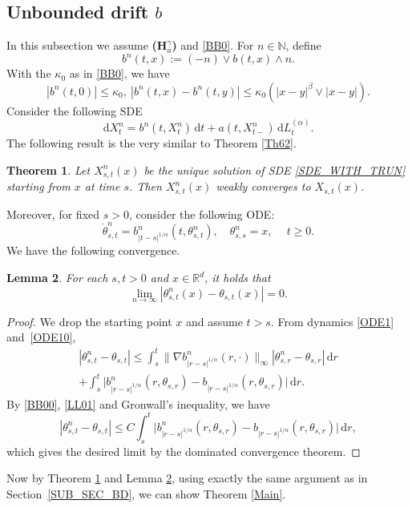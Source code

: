 \documentclass[JEP,XML,SOM,Unicode,published]{cedram}
\newcommand{\rd}{\mathrm{d}}
\theoremstyle{plain}
\newtheorem{theorem}{Theorem}[section]
\newtheorem{lemma}[theorem]{Lemma}
\theoremstyle{definition}
\newcommand\mN{\mathbb{N}}
\newcommand\mR{\mathbb{R}}
\newcommand\1{{\mathbf{1}}}
\newcommand{\dif}{\,\mathrm{d}}
\begin{document}
\subsection{Unbounded drift $b$} \label{SUB_SEC_TRUNC}
In this subsection we assume {\bf (H$^\gamma_a$)} and \eqref{BB0}.
For $n\in\mN$, define
\[
b^n(t,x):=(-n)\vee b(t,x)\wedge n.
\]
With the $\kappa_0$ as in \eqref{BB0}, we have
\begin{equation}\label{BB00}
|b^n(t,0)|\le \kappa_0,\ |b^n(t,x)-b^n(t,y)|\leq\kappa_0(|x-y|^\beta\vee|x-y|).
\end{equation}
Consider the following SDE
\begin{equation}
\rd X_t^n=b^n(t,X_t^n)\dif t+a(t,X_{t-}^n)\dif L^{(\alpha)}_t.
\label{SDE_WITH_TRUN}
\end{equation}
The following result is the very similar to Theorem \ref{Th62}.
\begin{theorem}\label{Th622}
Let $X^n_{s,t}(x)$ be the unique solution of SDE \eqref{SDE_WITH_TRUN} starting from $x$ at time $s$. Then $X^n_{s,t}(x)$ weakly converges to $X_{s,t}(x)$.
\end{theorem}
Moreover, for fixed $s>0$, consider the following ODE:
\begin{equation}\label{ODE10}
\dot\theta^n_{s,t}=b^n_{|t-s|^{1/\alpha}}(t,\theta^n_{s,t}),\quad \theta^n_{s,s}=x,\quad \ t\geq 0.
\end{equation}
We have the following convergence.
\begin{lemma}\label{Le53}
For each $s,t>0$ and $x\in\mR^d$, it holds that
\[
\lim_{n\to\infty}|\theta^n_{s,t}(x)-\theta_{s,t}(x)|=0.
\]
\end{lemma}
\begin{proof}
We drop the starting point $x$ and assume $t\!>\!s$. From dynamics \eqref{ODE1} and~\eqref{ODE10},
\begin{multline*}
|\theta^n_{s,t}-\theta_{s,t}|
\leq\int^t_s\|\nabla b^n_{|r-s|^{1/\alpha}}(r,\cdot)\|_\infty|\theta^n_{s,r}-\theta_{s,r}|\dif r\\
+\int^t_s\big|b^n_{|r-s|^{1/\alpha}}(r,\theta_{s,r})-b_{|r-s|^{1/\alpha}}(r,\theta_{s,r})\big|\dif r.
\end{multline*}
By \eqref{BB00}, \eqref{LL01} and Gronwall's inequality, we have
\[
|\theta^n_{s,t}-\theta_{s,t}|\leq C\int^t_s\big|b^n_{|r-s|^{1/\alpha}}(r,\theta_{s,r})-b_{|r-s|^{1/\alpha}}(r,\theta_{s,r})\big|\dif r,
\]
which gives the desired limit by the dominated convergence theorem.
\end{proof}
Now by Theorem \ref{Th622} and Lemma \ref{Le53}, using exactly the same argument as in Section~\ref{SUB_SEC_BD}, we can show Theorem \ref{Main}.\enlargethispage{-\baselineskip}

\backmatter


\end{document}
